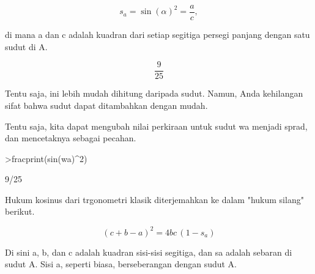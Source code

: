 \documentclass[a4paper,10pt]{article}
\begin{document}
\begin{eulernotebook}
\begin{eulercomment}
\begin{eulercomment}
\begin{eulercomment}
\begin{eulercomment}
\begin{eulercomment}
\begin{eulercomment}
\begin{eulercomment}
\begin{eulercomment}
\begin{eulercomment}
\begin{eulercomment}
\begin{eulercomment}
\begin{eulercomment}
\begin{eulercomment}
\begin{eulercomment}
\begin{eulercomment}
\begin{eulercomment}
\begin{eulercomment}
\begin{eulercomment}
\begin{eulercomment}
\end{eulercomment}
\begin{eulerformula}
\[
s_a = \sin(\alpha)^2 = \frac{a}{c},
\]
\end{eulerformula}
\begin{eulercomment}
di mana a dan c adalah kuadran dari setiap segitiga persegi panjang
dengan satu sudut di A.
\end{eulercomment}
\begin{eulerformula}
\[
\frac{9}{25}
\]
\end{eulerformula}
\begin{eulercomment}
Tentu saja, ini lebih mudah dihitung daripada sudut. Namun, Anda
kehilangan sifat bahwa sudut dapat ditambahkan dengan mudah.

Tentu saja, kita dapat mengubah nilai perkiraan untuk sudut wa menjadi
sprad, dan mencetaknya sebagai pecahan.
\end{eulercomment}
\begin{eulerprompt}
>fracprint(sin(wa)^2)
\end{eulerprompt}
\begin{euleroutput}
  9/25
\end{euleroutput}
\begin{eulercomment}
Hukum kosinus dari trgonometri klasik diterjemahkan ke dalam "hukum
silang" berikut.

\end{eulercomment}
\begin{eulerformula}
\[
(c+b-a)^2 = 4 b c \, (1-s_a)
\]
\end{eulerformula}
\begin{eulercomment}
Di sini a, b, dan c adalah kuadran sisi-sisi segitiga, dan sa adalah
sebaran di sudut A. Sisi a, seperti biasa, berseberangan dengan sudut
A.


\end{eulercomment}
\end{eulercomment}
\end{eulercomment}
\end{eulercomment}
\end{eulercomment}
\end{eulercomment}
\end{eulercomment}
\end{eulercomment}
\end{eulercomment}
\end{eulercomment}
\end{eulercomment}
\end{eulercomment}
\end{eulercomment}
\end{eulercomment}
\end{eulercomment}
\end{eulercomment}
\end{eulercomment}
\end{eulercomment}
\end{eulercomment}
\end{eulernotebook}
\end{document}
